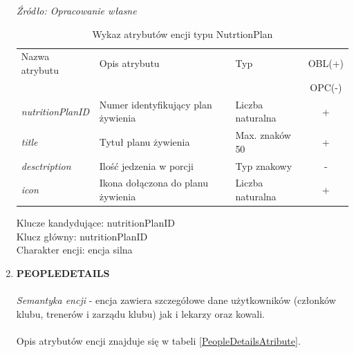 \documentclass[12pt,twoside]{report}
\begin{document}
\begin{enumerate}[start=10,label={\bfseries ENC$\backslash$\arabic*}]
\begin{table}[H]
	\caption{Wykaz atrybutów encji typu NutrtionPlan }
	\textit{Źródło: Opracowanie własne}
	\label{NutritionPlanAtribute}
	\centering
	\begin{tabular}{|l|l|l|c|}
		\hline
		Nazwa atrybutu & Opis atrybutu & Typ & OBL(+) \\
		& & &  OPC(-) \\
		\hline
		\textit{nutritionPlanID} & Numer identyfikujący plan żywienia & Liczba naturalna & + \\
		\hline
		\textit{title} &  Tytuł planu żywienia & Max. znaków 50 & + \\
		\hline
		\textit{desctription} &  Ilość jedzenia w porcji & Typ znakowy & - \\
		\hline
		\textit{icon} &  Ikona dołączona do planu żywienia & Liczba naturalna & + \\
		\hline
	\end{tabular}
\end{table}
Klucze kandydujące: nutritionPlanID \\
Klucz główny: nutritionPlanID \\
Charakter encji: encja silna \\
	\item \textbf{PEOPLEDETAILS}\\ \\
	\textit{Semantyka encji} - encja zawiera szczegółowe dane użytkowników (członków klubu, trenerów i zarządu klubu) jak i lekarzy oraz kowali.
			\\ \\
	Opis atrybutów encji znajduje się w tabeli \ref{PeopleDetailsAtribute}.
	

\end{enumerate}
\end{document}
